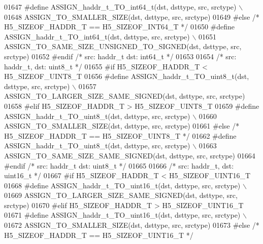 \begin{DoxyCode}
01647 \textcolor{preprocessor}{    #define ASSIGN\_haddr\_t\_TO\_int64\_t(dst, dsttype, src, srctype) \(\backslash\)}
01648 \textcolor{preprocessor}{        ASSIGN\_TO\_SMALLER\_SIZE(dst, dsttype, src, srctype)}
01649 \textcolor{preprocessor}{#else }\textcolor{comment}{/* H5\_SIZEOF\_HADDR\_T == H5\_SIZEOF\_INT64\_T */}\textcolor{preprocessor}{}
01650 \textcolor{preprocessor}{    #define ASSIGN\_haddr\_t\_TO\_int64\_t(dst, dsttype, src, srctype) \(\backslash\)}
01651 \textcolor{preprocessor}{        ASSIGN\_TO\_SAME\_SIZE\_UNSIGNED\_TO\_SIGNED(dst, dsttype, src, srctype)}
01652 \textcolor{preprocessor}{#endif }\textcolor{comment}{/* src: haddr\_t dst: int64\_t */}\textcolor{preprocessor}{}
01653 
01654 \textcolor{comment}{/* src: haddr\_t, dst: uint8\_t */}
01655 \textcolor{preprocessor}{#if H5\_SIZEOF\_HADDR\_T < H5\_SIZEOF\_UINT8\_T}
01656 \textcolor{preprocessor}{    #define ASSIGN\_haddr\_t\_TO\_uint8\_t(dst, dsttype, src, srctype) \(\backslash\)}
01657 \textcolor{preprocessor}{        ASSIGN\_TO\_LARGER\_SIZE\_SAME\_SIGNED(dst, dsttype, src, srctype)}
01658 \textcolor{preprocessor}{#elif H5\_SIZEOF\_HADDR\_T > H5\_SIZEOF\_UINT8\_T}
01659 \textcolor{preprocessor}{    #define ASSIGN\_haddr\_t\_TO\_uint8\_t(dst, dsttype, src, srctype) \(\backslash\)}
01660 \textcolor{preprocessor}{        ASSIGN\_TO\_SMALLER\_SIZE(dst, dsttype, src, srctype)}
01661 \textcolor{preprocessor}{#else }\textcolor{comment}{/* H5\_SIZEOF\_HADDR\_T == H5\_SIZEOF\_UINT8\_T */}\textcolor{preprocessor}{}
01662 \textcolor{preprocessor}{    #define ASSIGN\_haddr\_t\_TO\_uint8\_t(dst, dsttype, src, srctype) \(\backslash\)}
01663 \textcolor{preprocessor}{        ASSIGN\_TO\_SAME\_SIZE\_SAME\_SIGNED(dst, dsttype, src, srctype)}
01664 \textcolor{preprocessor}{#endif }\textcolor{comment}{/* src: haddr\_t dst: uint8\_t */}\textcolor{preprocessor}{}
01665 
01666 \textcolor{comment}{/* src: haddr\_t, dst: uint16\_t */}
01667 \textcolor{preprocessor}{#if H5\_SIZEOF\_HADDR\_T < H5\_SIZEOF\_UINT16\_T}
01668 \textcolor{preprocessor}{    #define ASSIGN\_haddr\_t\_TO\_uint16\_t(dst, dsttype, src, srctype) \(\backslash\)}
01669 \textcolor{preprocessor}{        ASSIGN\_TO\_LARGER\_SIZE\_SAME\_SIGNED(dst, dsttype, src, srctype)}
01670 \textcolor{preprocessor}{#elif H5\_SIZEOF\_HADDR\_T > H5\_SIZEOF\_UINT16\_T}
01671 \textcolor{preprocessor}{    #define ASSIGN\_haddr\_t\_TO\_uint16\_t(dst, dsttype, src, srctype) \(\backslash\)}
01672 \textcolor{preprocessor}{        ASSIGN\_TO\_SMALLER\_SIZE(dst, dsttype, src, srctype)}
01673 \textcolor{preprocessor}{#else }\textcolor{comment}{/* H5\_SIZEOF\_HADDR\_T == H5\_SIZEOF\_UINT16\_T */}\textcolor{preprocessor}{}

\end{DoxyCode}
